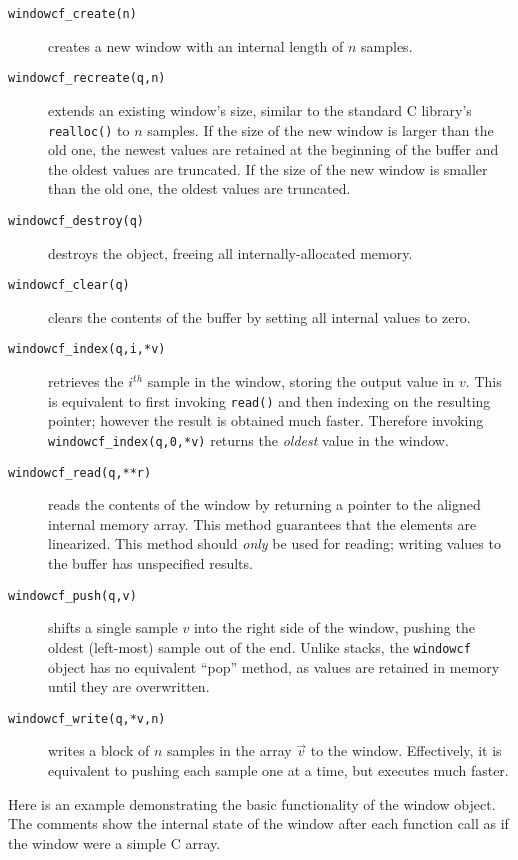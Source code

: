 \begin{description}
\item[{\tt windowcf\_create(n)}]
    creates a new window with an internal length of $n$ samples.
\item[{\tt windowcf\_recreate(q,n)}]
    extends an existing window's size, similar to the standard C library's
    {\tt realloc()} to $n$ samples.
    If the size of the new window is larger than the old one, the newest
    values are retained at the beginning of the buffer and the oldest
    values are truncated.
    If the size of the new window is smaller than the old one, the
    oldest values are truncated.
\item[{\tt windowcf\_destroy(q)}]
    destroys the object, freeing all internally-allocated memory.
\item[{\tt windowcf\_clear(q)}]
    clears the contents of the buffer by setting all internal values to zero.
\item[{\tt windowcf\_index(q,i,*v)}]
    retrieves the $i^{th}$ sample in the window, storing the output
    value in $v$.
    This is equivalent to first invoking {\tt read()} and then indexing
    on the resulting pointer;
    however the result is obtained much faster.
    Therefore invoking {\tt windowcf\_index(q,0,*v)} returns the
    {\em oldest} value in the window.
\item[{\tt windowcf\_read(q,**r)}]
    reads the contents of the window by returning a pointer to the
    aligned internal memory array.
    This method guarantees that the elements are linearized.
    This method should {\em only} be used for reading; writing values to
    the buffer has unspecified results.
\item[{\tt windowcf\_push(q,v)}]
    shifts a single sample $v$ into the right side of the window,
    pushing the oldest (left-most) sample out of the end.
    Unlike stacks, the {\tt windowcf} object has no equivalent ``pop''
    method, as values are retained in memory until they are overwritten.
\item[{\tt windowcf\_write(q,*v,n)}]
    writes a block of $n$ samples in the array $\vec{v}$ to the window.
    Effectively, it is equivalent to pushing each sample one at a time,
    but executes much faster.
\end{description}

Here is an example demonstrating the basic functionality of the window object.
The comments show the internal state of the window after each function call as
if the window were a simple C array.
%



